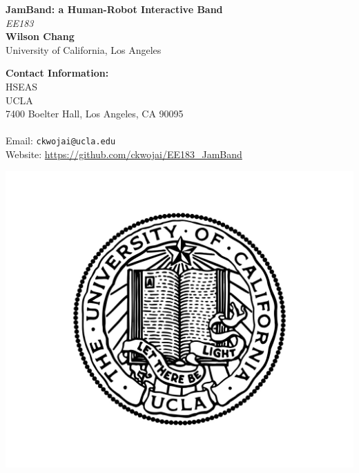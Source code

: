 \documentclass[a0,landscape]{a0poster}
\begin{document}


\begin{minipage}[b]{0.55\linewidth}
\veryHuge \color{NavyBlue} \textbf{JamBand: a Human-Robot Interactive Band} \color{Black}\\ %
\Huge\textit{EE183}\\[1cm] %
\huge \textbf{Wilson Chang}\\ %
\huge University of California, Los Angeles\\ %
\end{minipage}
%
\begin{minipage}[b]{0.25\linewidth}
\color{DarkSlateGray}\Large \textbf{Contact Information:}\\
HSEAS\\ %
UCLA\\
7400 Boelter Hall, Los Angeles, CA 90095 \\\\

Email: \texttt{ckwojai@ucla.edu}\\ %
Website: \href{https://github.com/ckwojai/EE183\_JamBand}{https://github.com/ckwojai/EE183\_JamBand}\\ %

\end{minipage}
%
\begin{minipage}[b]{0.19\linewidth}
\includegraphics[width=20cm]{logo.jpg} %
\end{minipage}
\end{document}
